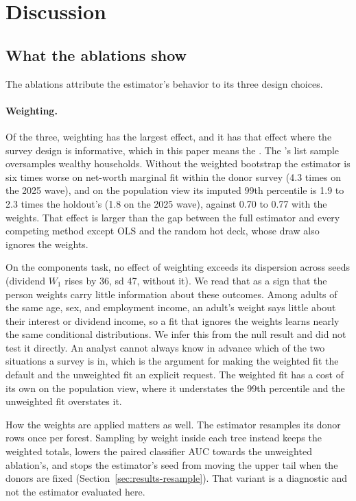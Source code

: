 \section{Discussion}
\label{sec:discussion}

\subsection{What the ablations show}
\label{sec:discussion-ablations}

The ablations attribute the estimator's behavior to its three design
choices.

\paragraph{Weighting.} Of the three, weighting has the largest effect, and
it has that effect where the survey design is informative, which in this
paper means the \scf{}. The \scf{}'s list sample oversamples wealthy
households. Without the weighted bootstrap the estimator is six times worse
on net-worth marginal fit within the donor survey (4.3 times on the 2025
wave), and on the population view its imputed 99th percentile is 1.9 to 2.3
times the holdout's (1.8 on the 2025 wave), against 0.70 to 0.77 with the
weights. That effect is larger than the gap between the full estimator and
every competing method except OLS and the random hot deck, whose draw also
ignores the weights.

On the \cps{} components task, no effect of weighting exceeds its dispersion
across seeds (dividend $W_1$ rises by 36, sd 47, without it). We read that
as a sign that the \cps{} person weights carry little information about
these outcomes. Among adults of the same age, sex, and employment income, an
adult's weight says little about their interest or dividend income, so a fit
that ignores the weights learns nearly the same conditional distributions.
We infer this from the null result and did not test it directly. An analyst
cannot always know in advance which of the two situations a survey is in,
which is the argument for making the weighted fit the default and the
unweighted fit an explicit request. The weighted fit has a cost of its own
on the population view, where it understates the 99th percentile and the
unweighted fit overstates it.

How the weights are applied matters as well. The estimator resamples its
donor rows once per forest. Sampling by weight inside each tree instead
keeps the weighted totals, lowers the paired classifier AUC towards the
unweighted ablation's, and stops the estimator's seed from moving the upper
tail when the donors are fixed (Section~\ref{sec:results-resample}). That
variant is a diagnostic and not the estimator evaluated here.

